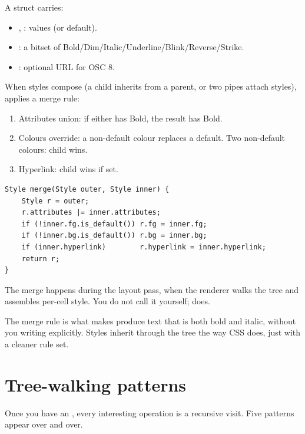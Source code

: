 A  struct carries:

\begin{itemize}[leftmargin=*]
  \item {}, :  values (or default).
  \item {}: a bitset of
    Bold/Dim/Italic/Underline/Blink/Reverse/Strike.
  \item {}: optional URL for OSC 8.
\end{itemize}

When styles compose (a child inherits from a parent, or two
pipes attach styles), \maya{} applies a merge rule:

\begin{enumerate}[leftmargin=*]
  \item Attributes union: if either has Bold, the result has
    Bold.
  \item Colours override: a non-default colour replaces a
    default. Two non-default colours: child wins.
  \item Hyperlink: child wins if set.
\end{enumerate}

\begin{lstlisting}
Style merge(Style outer, Style inner) {
    Style r = outer;
    r.attributes |= inner.attributes;
    if (!inner.fg.is_default()) r.fg = inner.fg;
    if (!inner.bg.is_default()) r.bg = inner.bg;
    if (inner.hyperlink)        r.hyperlink = inner.hyperlink;
    return r;
}
\end{lstlisting}

The merge happens during the layout pass, when the renderer walks
the tree and assembles per-cell style. You do not call it
yourself; \maya{} does.

\begin{idea}
The merge rule is what makes
 produce text that is both bold
and italic, without you writing  explicitly.
Styles inherit through the tree the way CSS does, just with a
cleaner rule set.
\end{idea}

\section{Tree-walking patterns}

Once you have an , every interesting operation is a
recursive visit. Five patterns appear over and over.


